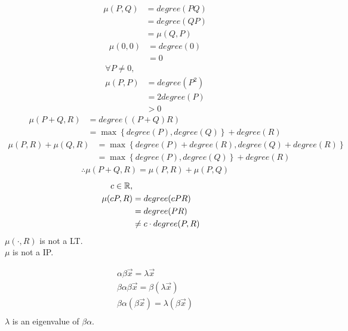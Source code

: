\documentclass[1]{mathtoolkit}
\begin{document}
\begin{p}
  \item
    \begin{align}
      \mu(P, Q) & = degree(PQ) \\
                & = degree(QP) \\
                & = \mu(Q, P)
    \end{align}
    \begin{align}
      \mu(0, 0) & = degree(0) \\
                & = 0
    \end{align}
    \begin{align}
      \forall P \ne 0, \\
      \mu(P, P) & = degree(P^2) \\
                & = 2 degree(P) \\
                & > 0
    \end{align}
    \begin{align}
      \mu(P + Q, R) & = degree((P + Q) R) \\
                    & = \max \left\{ degree(P), degree(Q) \right\} + degree(R)
    \end{align}
    \begin{align}
      \mu(P, R) + \mu(Q, R) & = \max \left\{ degree(P) + degree(R), degree(Q) + degree(R) \right\} \\
                            & = \max \left\{ degree(P), degree(Q) \right\} + degree(R)
    \end{align}
    \begin{gather}
      \therefore \mu(P + Q, R) = \mu(P, R) + \mu(P, Q)
    \end{gather}
    \begin{align}
      c \in \mathbb{R}, \\
      \mu(cP, R) & = degree(cPR) \\
                 & = degree(PR) \\
                 & \ne c \cdot degree(P, R)
    \end{align}
    \therefore $\mu(\cdot, R)$ is not a LT. \\
    \therefore $\mu$ is not a IP.

  \item
    \begin{gather}
      \alpha \beta \vec{x} = \lambda \vec{x} \\
      \beta \alpha \beta \vec{x} = \beta (\lambda \vec{x}) \\
      \beta \alpha (\beta \vec{x}) = \lambda (\beta \vec{x}) \\
    \end{gather}
    \therefore $\lambda$ is an eigenvalue of $\beta \alpha$.


\end{p}
\end{document}
